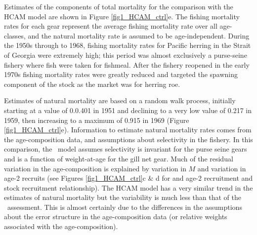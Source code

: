Estimates of the components of total mortality for the comparison with the HCAM model are shown in Figure \ref{fig1_HCAM_ctrl}e.  The fishing mortality rates for each gear represent the average fishing mortality rate over all age-classes, and the natural mortality rate is assumed to be age-independent.  During the 1950s through to 1968, fishing mortality rates for Pacific herring in the Strait of Georgia were extremely high; this period was almost exclusively a purse-seine fishery where fish were taken for fishmeal.  After the fishery reopened in the early 1970s fishing mortality rates were greatly reduced and targeted the spawning component of the stock as the market was for herring roe. 

Estimates of natural mortality are based on a random walk process, initially starting at a value of 0.0.401 in 1951 and declining to a very low value of 0.217 in 1959, then increasing to a maximum of 0.915 in 1969 (Figure \ref{fig1_HCAM_ctrl}e).  Information to estimate natural mortality rates comes from the age-composition data, and assumptions about selectivity in the fishery.  In this comparison, the \iscam\ model assumes selectivity is invariant for the purse seine gears and is a function of weight-at-age for the gill net gear. Much of the residual variation in the age-composition is explained by variation in $M$ and variation in age-2 recruits (see Figures \ref{fig1_HCAM_ctrl}c \& d for and age-2 recruitment and stock recruitment relationship).  The HCAM model has a very similar trend in the estimates of natural mortality but the variability is much less than that of the \iscam\ assessment.  This is almost certainly due to the differences in the assumptions about the error structure in the age-composition data (or relative weights associated with the age-composition).




